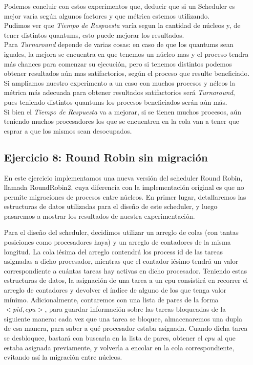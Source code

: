 \vspace{0,5 cm}
Podemos concluir con estos experimentos que, deducir que si un Scheduler es mejor var\'ia seg\'un algunos factores y que m\'etrica estemos utilizando.\\
Pudimos ver que \textit{Tiempo de Respuesta} var\'ia segun la cantidad de n\'ucleos y, de tener distintos quantums, esto puede mejorar los resultados.\\
Para \textit{Turnaround} depende de varias cosas: en caso de que los quantums sean iguales, la mejora se encuentra en que tenemos un n\'ucleo mas y el proceso tendra m\'as chances para comenzar su ejecuci\'on, pero si tenemos distintos podemos obtener resultados a\'un mas satifactorios, seg\'un el proceso que resulte beneficiado.\\
Si ampliamos nuestro experimento a un caso con muchos procesos y n\'cleos la m\'etrica m\'as adecuada para obtener resultados satifactorios ser\'a \textit{Turnaround}, pues teniendo distintos quantums los procesos beneficiados ser\'an a\'un m\'as. \\
Si bien el \textit{Tiempo de Respuesta} va a mejorar, si se tienen muchos procesos, a\'un teniendo muchos procesadores los que se encuentren en la cola van a tener que esprar a que los mismos sean desocupados.

\subsection{Ejercicio 8: Round Robin sin migraci\'on}

En este ejercicio implementamos una nueva versi\'on del scheduler Round Robin, llamada RoundRobin2, cuya diferencia con la implementaci\'on original
es que no permite migraciones de procesos entre n\'ucleos. En primer lugar, detallaremos las estructuras de datos utilizadas para el dise\~no de
este scheduler, y luego pasaremos a mostrar los resultados de nuestra experimentaci\'on.

Para el dise\~no del scheduler, decidimos utilizar un arreglo de colas (con tantas posiciones como procesadores haya) y un arreglo de contadores de la misma 
longitud. La cola i\'esima del arreglo contendr\'a los process id de las tareas asignadas a dicho procesador, mientras que el contador i\'esimo tendr\'a un 
valor correspondiente a cu\'antas tareas hay activas en dicho procesador. Teniendo estas estructuras de datos, la asignaci\'on de una tarea a un cpu consistir\'a
en recorrer el arreglo de contadores y devolver el \'indice de alguno de los que tenga valor m\'inimo. 
Adicionalmente, contaremos con una lista de pares de la forma $<pid,cpu>$, para guardar informaci\'on sobre las tareas bloqueadas de la siguiente manera: 
cada vez que una tarea se bloquee, almacenaremos una dupla de esa manera, para saber a qu\'e procesador estaba asignada. Cuando dicha tarea se desbloquee,
bastar\'a con buscarla en la lista de pares, obtener el $cpu$ al que estaba asignada previamente, y volverla a encolar en la cola correspondiente, evitando
as\'i la migraci\'on entre n\'ucleos.


